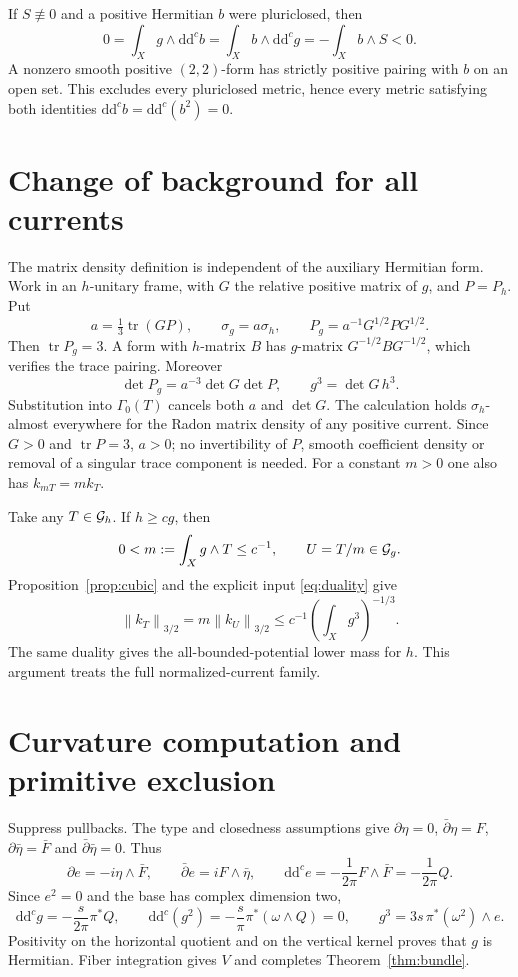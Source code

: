 \documentclass[11pt]{article}
\newcommand{\ddc}{\mathrm d\mathrm d^c}
\newcommand{\norm}[1]{\left\|#1\right\|}
\begin{document}
If \(S\not\equiv0\) and a positive Hermitian \(b\) were pluriclosed, then
\[
 0=\int_Xg\wedge\ddc b=\int_X b\wedge\ddc g
                   =-\int_Xb\wedge S<0.
\]
A nonzero smooth positive \((2,2)\)-form has strictly positive pairing
with \(b\) on an open set. This excludes every pluriclosed metric, hence
every metric satisfying both identities \(\ddc b=\ddc(b^2)=0\).

\section{Change of background for all currents}

The matrix density definition is independent of the auxiliary Hermitian
form. Work in an \(h\)-unitary frame, with \(G\) the relative positive
matrix of \(g\), and \(P=P_h\). Put
\[
 a=\tfrac13\operatorname{tr}(GP),\qquad
 \sigma_g=a\sigma_h,\qquad P_g=a^{-1}G^{1/2}PG^{1/2}.
\]
Then \(\operatorname{tr}P_g=3\). A form with \(h\)-matrix \(B\) has
\(g\)-matrix \(G^{-1/2}BG^{-1/2}\), which verifies the trace pairing.
Moreover
\[
 \det P_g=a^{-3}\det G\det P,\qquad g^3=\det G\,h^3.
\]
Substitution into \(\Gamma_0(T)\) cancels both \(a\) and \(\det G\).
The calculation holds \(\sigma_h\)-almost everywhere for the
Radon matrix density of any positive current. Since \(G>0\) and
\(\operatorname{tr}P=3\), \(a>0\); no invertibility of \(P\), smooth
coefficient density or removal of a singular trace component is needed.
For a constant \(m>0\) one also has \(k_{mT}=m k_T\).

Take any \(T\in{\cal G}_h\). If \(h\ge c g\), then
\[
 0<m:=\int_Xg\wedge T\le c^{-1},\qquad U=T/m\in{\cal G}_g.
\]
Proposition~\ref{prop:cubic} and the explicit input
\eqref{eq:duality} give
\[
 \norm{k_T}_{3/2}=m\norm{k_U}_{3/2}
                         \le c^{-1}\left(\int_Xg^3\right)^{-1/3}.
\]
The same duality gives the all-bounded-potential lower mass for \(h\).
This argument treats the full normalized-current family.

\section{Curvature computation and primitive exclusion}

Suppress pullbacks. The type and closedness assumptions give
\(\partial\eta=0\), \(\bar\partial\eta=F\),
\(\partial\bar\eta=\bar F\) and \(\bar\partial\bar\eta=0\).
Thus
\[
 \partial e=-i\eta\wedge\bar F,\qquad
 \bar\partial e=iF\wedge\bar\eta,\qquad
 \ddc e=-\frac1{2\pi}F\wedge\bar F=-\frac1{2\pi}Q.
\]
Since \(e^2=0\) and the base has complex dimension two,
\[
 \ddc g=-\frac{s}{2\pi}\pi^*Q,\qquad
 \ddc(g^2)=-\frac{s}{\pi}\pi^*(\omega\wedge Q)=0,\qquad
 g^3=3s\,\pi^*(\omega^2)\wedge e.
\]
Positivity on the horizontal quotient and on the vertical kernel proves
that \(g\) is Hermitian. Fiber integration gives \(V\) and completes
Theorem~\ref{thm:bundle}.
\end{document}
